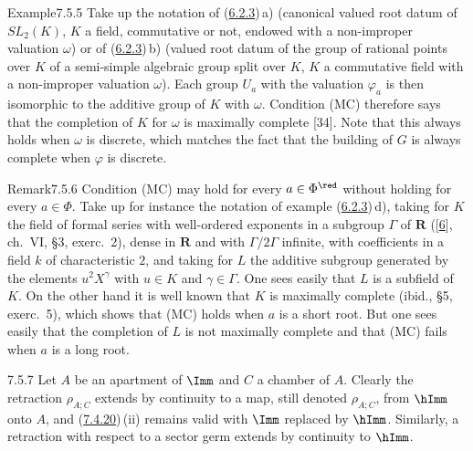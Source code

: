 \documentclass[12pt,a4paper,oneside,english]{smfart}
\makeatletter
\newcommand{\btanchor}[1]{\leavevmode\Hy@raisedlink{\hypertarget{bt:#1}{}}}
\newcommand{\btref}[1]{\hyperlink{bt:#1}{#1}}
\newcommand{\btbib}[1]{\hyperlink{bib:#1}{#1}}
\theoremstyle{definition}
\theoremstyle{bt}
\makeatother
\begin{document}
\begin{stmt}{Example}{7.5.5}\btanchor{7.5.5}
Take up the notation of \textup{(\btref{6.2.3})\,a)} (canonical valued root datum of
$SL_2(K)$, $K$ a field, commutative or not, endowed with a non-improper valuation
$\omega$) or of \textup{(\btref{6.2.3})\,b)} (valued root datum of the group of rational
points over $K$ of a semi-simple algebraic group split over $K$, $K$ a commutative
field with a non-improper valuation $\omega$). Each group $U_a$ with the valuation
$\varphi_a$ is then isomorphic to the additive group of $K$ with $\omega$. Condition
\textup{(MC)} therefore says that the completion of $K$ for $\omega$ is maximally
complete \textup{[34]}. Note that this always holds when $\omega$ is discrete, which
matches the fact that the building of $G$ is always complete when $\varphi$ is
discrete.
\end{stmt}

\begin{stmt}{Remark}{7.5.6}\btanchor{7.5.6}
Condition \textup{(MC)} may hold for every $a\in\Phi^{\red}$ without holding for
every $a\in\Phi$. Take up for instance the notation of example
\textup{(\btref{6.2.3})\,d)}, taking for $K$ the field of formal series with well-ordered
exponents in a subgroup $\Gamma$ of $\mathbf{R}$ \textup{([\btbib{6}], ch.~VI, \S3,
exerc.~2)}, dense in $\mathbf{R}$ and with $\Gamma/2\Gamma$ infinite, with
coefficients in a field $k$ of characteristic $2$, and taking for $L$ the additive
subgroup generated by the elements $u^{2}X^{\gamma}$ with $u\in K$ and
$\gamma\in\Gamma$. One sees easily that $L$ is a subfield of $K$. On the other hand
it is well known that $K$ is maximally complete \textup{(ibid., \S5, exerc.~5)},
which shows that \textup{(MC)} holds when $a$ is a short root. But one sees easily
that the completion of $L$ is not maximally complete and that \textup{(MC)} fails
when $a$ is a long root.
\end{stmt}

\num{7.5.7}\btanchor{7.5.7} Let $A$ be an apartment of $\Imm$ and $C$ a chamber of $A$. Clearly the
retraction $\rho_{A;C}$ extends by continuity to a map, still denoted $\rho_{A;C}$,
from $\hImm$ onto $A$, and (\btref{7.4.20})\,(ii) remains valid with $\Imm$ replaced by
$\hImm$. Similarly, a retraction with respect to a sector germ extends by
continuity to $\hImm$.
\end{document}
